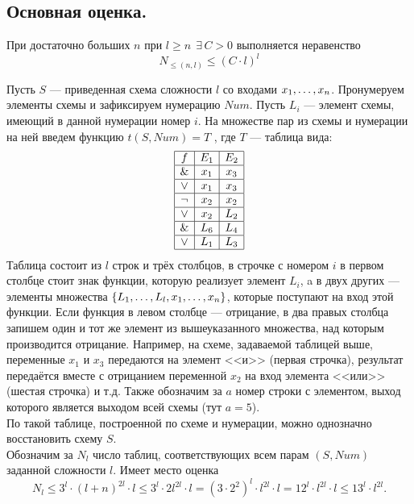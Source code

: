 \subsection{Основная оценка.}
\begin{lemma}
При достаточно больших $n$ при $l\geq n \:\: \exists \, C>0$ выполняется неравенство\\
$$N_{\leq(n,l)}\leq (C\cdot l)^l $$
\end{lemma}
Пусть $S$ --- приведенная схема сложности $l$ со входами $x_1, \ldots, x_n$.
Пронумеруем элементы схемы и зафиксируем нумерацию $Num$. Пусть $L_i$ --- элемент схемы, имеющий в данной нумерации номер $i$. На множестве пар из схемы и нумерации на ней введем функцию
$t(S,Num)= T$%
, где $T$ --- таблица вида:
$$
    \begin{array}{|c|c|c|}
    \hline
       f & E_1 & E_2 \\
      \hline
       \& & x_1 & x_3 \\
      \hline
       \vee & x_1 & x_3 \\
       \hline
       \neg & x_2 & x_2 \\
       \hline
     \vee & x_2 & L_2 \\
     \hline
      \& & L_6 & L_4\\
    \hline
    \vee & L_1 & L_3\\
    \hline
    \end{array}
    $$
Таблица состоит из $l$ строк и трёх столбцов, в строчке с номером $i$ в первом столбце стоит знак функции, которую реализует элемент $L_i$, a в двух других --- элементы множества $\{ L_1,\ldots,L_l, x_1, \ldots, x_n\} $, которые поступают на вход этой функции. %
Если функция в левом столбце --- отрицание, в два правых столбца запишем один и тот же элемент из вышеуказанного множества, над которым производится отрицание. Например, на схеме, задаваемой таблицей выше, переменные $x_1$ и $x_3$ передаются на элемент <<и>> (первая строчка), результат передаётся вместе с отрицанием переменной $x_2$ на вход элемента <<или>> (шестая строчка) и т.д. Также обозначим за $a$ номер строки с элементом, выход которого является выходом всей схемы (тут $a=5$). \\
По такой таблице, построенной по схеме и нумерации, можно однозначно восстановить схему $S$.\\
Обозначим за $N_l$ число таблиц, соответствующих всем парам $(S,Num)$ заданной сложности $l$. Имеет место оценка
$$ N_l\leq 3^l\cdot (l+n)^{2l} \cdot l \leq 3^l \cdot 2l^{2l}\cdot l = (3\cdot 2^2)^l\cdot l^{2l}\cdot l = 12^l \cdot l^{2l} \cdot l \leq 13^l\cdot l^{2l}.$$

